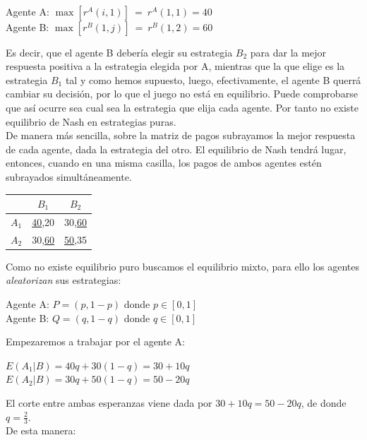 \\
\begin{center}
    Agente A: $ \max \left[ r^A (i,1)\right]\: = \: r^A(1,1)=40 $ \\
    Agente B: $ \max \left[ r^B(1,j)\right] \: = \: r^B(1,2) = 60$ \\
\end{center}
Es decir, que el agente B debería elegir su estrategia $B_2$ para dar la mejor respuesta positiva a la estrategia elegida por A, mientras que la que elige es la estrategia $B_1$ tal y como hemos supuesto, luego, efectivamente, el agente B querrá cambiar su decisión, por lo que el juego no está en equilibrio. Puede comprobarse que así ocurre sea cual sea la estrategia que elija cada agente. Por tanto no existe equilibrio de Nash en estrategias puras. 
\\
De manera más sencilla, sobre la matriz de pagos subrayamos la mejor respuesta de  cada agente, dada la estrategia del otro. El equilibrio de Nash tendrá lugar, entonces, cuando en una misma casilla, los pagos de ambos agentes estén subrayados simultáneamente.
\\
    \begin{center}
    \begin{tabular}{ccc}
    \hline
       & $B_1$    & $B_2$    \\ \hline
    $A_1$ & \underline{40},20 & 30,\underline{60} \\
    $A_2$ & 30,\underline{60}  & \underline{50},35  \\ \hline
    \end{tabular}
    \end{center}
Como no existe equilibrio puro buscamos el equilibrio mixto, para ello los agentes \textit{aleatorizan} sus estrategias:
\begin{center}
    Agente A: $P = (p,1-p)$ donde $p\in [0,1]$ \\
    Agente B: $Q = (q,1-q)$ donde $q \in [0,1]$\\
\end{center}
Empezaremos a trabajar por el agente A:\\
\begin{center}
    $E(A_1|B)=40q+30(1-q)=30+10q $ \\
    $E(A_2|B)=30q+50(1-q)=50-20q $ \\
\end{center}
El corte entre ambas esperanzas viene dada por $30+10q = 50-20q$, de donde $q=\frac{2}{3}$.
\\
De esta manera:
